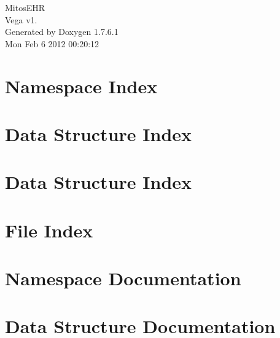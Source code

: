 \documentclass[a4paper]{book}
\begin{document}
\hypersetup{pageanchor=false,citecolor=blue}
\begin{titlepage}
\vspace*{7cm}
\begin{center}
{\Large \-Mitos\-E\-H\-R \\[1ex]\large \-Vega v1. }\\
\vspace*{1cm}
{\large \-Generated by Doxygen 1.7.6.1}\\
\vspace*{0.5cm}
{\small Mon Feb 6 2012 00:20:12}\\
\end{center}
\end{titlepage}
\clearemptydoublepage
{}
\tableofcontents
\clearemptydoublepage
{}
\hypersetup{pageanchor=true,citecolor=blue}
\chapter{\-Namespace \-Index}

\chapter{\-Data \-Structure \-Index}

\chapter{\-Data \-Structure \-Index}

\chapter{\-File \-Index}

\chapter{\-Namespace \-Documentation}

\chapter{\-Data \-Structure \-Documentation}























\end{document}
